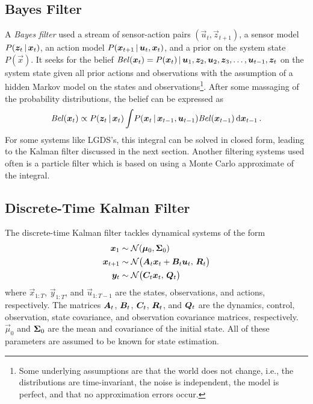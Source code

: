 		\subsection{Bayes Filter}
			A \emph{Bayes filter} used a stream of sensor-action pairs \( (\vec{u}_t, \vec{z}_{t + 1}) \), a sensor model \( P(\bm{z}_t \,\vert\, \bm{x}_t) \), an action model \( P(\bm{x}_{t + 1} \,\vert\, \bm{u}_t, \bm{x}_t) \), and a prior on the system state \( P(\vec{x}) \). It seeks for the belief \( \mathit{Bel}(\bm{x}_t) = P(\bm{x}_t) \,\vert\, \bm{u}_1, \bm{z}_2, \bm{u}_2, \bm{z}_3, \dots, \bm{u}_{t - 1}, \bm{z}_t \) on the system state given all prior actions and observations with the assumption of a hidden Markov model on the states and observations\footnote{Some underlying assumptions are that the world does not change, i.e., the distributions are time-invariant, the noise is independent, the model is perfect, and that no approximation errors occur.}. After some massaging of the probability distributions, the belief can be expressed as
			\begin{equation}
				\mathit{Bel}(\bm{x}_t) \propto P(\bm{z}_t \,\vert\, \bm{x}_t) \int\! P(\bm{x}_t \,\vert\, \bm{x}_{t - 1}, \bm{u}_{t - 1}) \mathit{Bel}(\bm{x}_{t - 1}) \dd{\bm{x}_{t - 1}}.
			\end{equation}
			For some systems like LGDS's, this integral can be solved in closed form, leading to the Kalman filter discussed in the next section. Another filtering systems used often is a particle filter which is based on using a Monte Carlo approximate of the integral.

		\subsection{Discrete-Time Kalman Filter}
			The discrete-time Kalman filter tackles dynamical systems of the form
			\begin{align}
				\bm{x}_1       & \sim \mathcal{N}(\bm{\mu}_0, \bm{\Sigma}_0)                                        \\
				\bm{x}_{t + 1} & \sim \mathcal{N}\bigl( \bm{A}_t \bm{x}_t + \bm{B}_t \bm{u}_t,\, \bm{R}_t \bigr) \\
				\bm{y}_t       & \sim \mathcal{N}\bigl( \bm{C}_t \bm{x}_t,\, \bm{Q}_t \bigr)
			\end{align}
			where \(\vec{x}_{1:T}\), \(\vec{y}_{1:T}\), and \(\vec{u}_{1:T - 1}\) are the states, observations, and actions, respectively. The matrices \(\bm{A}_t\), \(\bm{B}_t\), \(\bm{C}_t\), \(\bm{R}_t\), and \(\bm{Q}_t\) are the dynamics, control, observation, state covariance, and observation covariance matrices, respectively. \(\vec{\mu}_0\) and \(\bm{\Sigma}_0\) are the mean and covariance of the initial state. All of these parameters are assumed to be known for state estimation.

